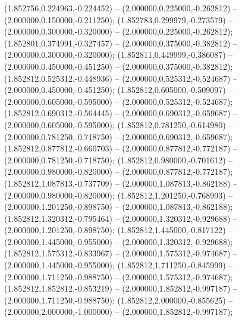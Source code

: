  (1.852756,0.224963,-0.224452) -- (2.000000,0.225000,-0.262812) -- (2.000000,0.150000,-0.211250);
 (1.852783,0.299979,-0.273579) -- (2.000000,0.300000,-0.320000) -- (2.000000,0.225000,-0.262812);
 (1.852801,0.374991,-0.327457) -- (2.000000,0.375000,-0.382812) -- (2.000000,0.300000,-0.320000);
 (1.852811,0.449999,-0.386087) -- (2.000000,0.450000,-0.451250) -- (2.000000,0.375000,-0.382812);
 (1.852812,0.525312,-0.448936) -- (2.000000,0.525312,-0.524687) -- (2.000000,0.450000,-0.451250);
 (1.852812,0.605000,-0.509097) -- (2.000000,0.605000,-0.595000) -- (2.000000,0.525312,-0.524687);
 (1.852812,0.690312,-0.564445) -- (2.000000,0.690312,-0.659687) -- (2.000000,0.605000,-0.595000);
 (1.852812,0.781250,-0.614980) -- (2.000000,0.781250,-0.718750) -- (2.000000,0.690312,-0.659687);
 (1.852812,0.877812,-0.660703) -- (2.000000,0.877812,-0.772187) -- (2.000000,0.781250,-0.718750);
 (1.852812,0.980000,-0.701612) -- (2.000000,0.980000,-0.820000) -- (2.000000,0.877812,-0.772187);
 (1.852812,1.087813,-0.737709) -- (2.000000,1.087813,-0.862188) -- (2.000000,0.980000,-0.820000);
 (1.852812,1.201250,-0.768993) -- (2.000000,1.201250,-0.898750) -- (2.000000,1.087813,-0.862188);
 (1.852812,1.320312,-0.795464) -- (2.000000,1.320312,-0.929688) -- (2.000000,1.201250,-0.898750);
 (1.852812,1.445000,-0.817122) -- (2.000000,1.445000,-0.955000) -- (2.000000,1.320312,-0.929688);
 (1.852812,1.575312,-0.833967) -- (2.000000,1.575312,-0.974687) -- (2.000000,1.445000,-0.955000);
 (1.852812,1.711250,-0.845999) -- (2.000000,1.711250,-0.988750) -- (2.000000,1.575312,-0.974687);
 (1.852812,1.852812,-0.853219) -- (2.000000,1.852812,-0.997187) -- (2.000000,1.711250,-0.988750);
 (1.852812,2.000000,-0.855625) -- (2.000000,2.000000,-1.000000) -- (2.000000,1.852812,-0.997187);

